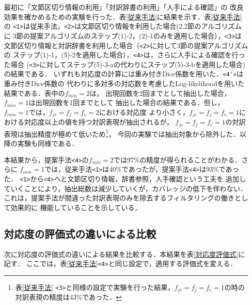 最初に「文節区切り情報の利用」「対訳辞書の利用」「人手による確認」の
改良効果を確かめるための実験を行った．表\ref{従来手法}に結果を示す．表\ref{従来手法}の
\verb|<1>|は従来手法，\verb|<2>|は文節区切り情報を利用した場合(2.2節のアルゴリズムに
3節の提案アルゴリズムのステップ(1)-2，(2)-1のみを適用した場合），\verb|<3>|は
文節区切り情報と対訳辞書を利用した場合（\verb|<2>|に対して3節の提案アルゴリズムの
ステップ(1)-1，(5)-2を適用した場合），\verb|<4>|は，さらに人手による確認を行った場合
(\verb|<3>|に対してステップ(5)-3-aの代わりにステップ(5)-3-bを適用した場合)の結果である．
いずれも対応度の計算には重み付きDice係数を用いた．\verb|<4'>|は重み付きDice係数の
代わりに多対多の対応数を考慮したLog-likelihoodを用いた結果である．表中の$f_{min}=2$は，
出現回数を2回までとして抽出した場合，$f_{min}=1$は出現回数を1回までとして
抽出した場合の結果である．但し，$f_{min}=1$では，$f_{je}=f_{j}=f_{e}=2$における対応度
より小さく，$f_{je}=f_{j}=f_{e}=1$における対応度以上の値を持つ対訳表現が抽出されるが，
$f_{je}=f_{j}=f_{e}=1$の対訳表現は抽出精度が極めて低いため\footnote{表\ref{従来手法}
\verb|<3>|と同様の設定で実験を行った結果，$f_{je}=f_{j}=f_{e}=1$の時の
対訳表現の精度は43\%であった．}，
今回の実験では抽出対象から除外した．以降の実験も同様である．

本結果から，提案手法\verb|<4>|の$f_{min}=2$では97\%の精度が得られることがわかる．さらに
$f_{min}=1$では，従来手法\verb|<1>|は40\%であったが，提案手法\verb|<4>|は93\%であった．
\verb|<1>|から\verb|<4>|へと文節区切り情報，辞書参照，人手確認という工夫を
追加していくことにより，抽出総数は減少していくが，カバレッジの低下を伴わない．
これは，提案手法が間違った対訳表現のみを除去するフィルタリングの働きとして効果的に
機能していることを示している．


\subsection{対応度の評価式の違いによる比較}
\label{評価式違いによる実験}

次に対応度の評価式の違いによる結果を比較する．本結果を表\ref{対応度評価式}に記す．
ここでは，表\ref{従来手法}\verb|<4>|と同じ設定で，適用する評価式を変える． 

